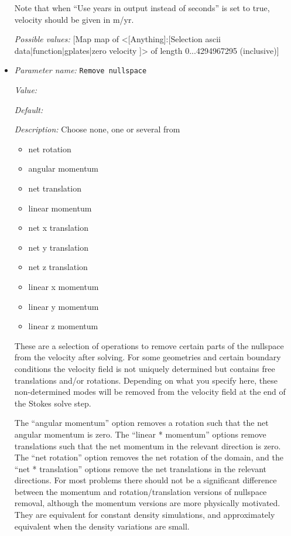 \begin{itemize}
Note that when ``Use years in output instead of seconds'' is set to true, velocity should be given in m/yr. 


{\it Possible values:} [Map map of <[Anything]:[Selection ascii data|function|gplates|zero velocity ]> of length 0...4294967295 (inclusive)]
\item {\it Parameter name:} {\tt Remove nullspace}
\label{parameters:Model settings/Remove nullspace}


{\it Value:} 


{\it Default:} 


{\it Description:} Choose none, one or several from 

\begin{itemize} \item net rotation \item angular momentum \item net translation \item linear momentum \item net x translation \item net y translation \item net z translation \item linear x momentum \item linear y momentum \item linear z momentum \end{itemize}

These are a selection of operations to remove certain parts of the nullspace from the velocity after solving. For some geometries and certain boundary conditions the velocity field is not uniquely determined but contains free translations and/or rotations. Depending on what you specify here, these non-determined modes will be removed from the velocity field at the end of the Stokes solve step.


The ``angular momentum'' option removes a rotation such that the net angular momentum is zero. The ``linear * momentum'' options remove translations such that the net momentum in the relevant direction is zero.  The ``net rotation'' option removes the net rotation of the domain, and the ``net * translation'' options remove the net translations in the relevant directions.  For most problems there should not be a significant difference between the momentum and rotation/translation versions of nullspace removal, although the momentum versions are more physically motivated. They are equivalent for constant density simulations, and approximately equivalent when the density variations are small.


\end{itemize}

